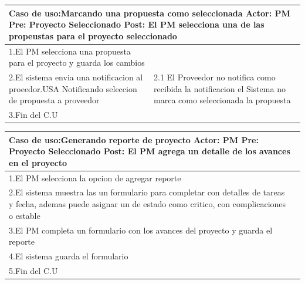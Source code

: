 \begin{longtable}{|p{}|p{}|}
    \hline
    \multicolumn{2}{|p{16cm}|}{
        \textbf{Caso de uso:}Marcando una propuesta como seleccionada\newline
        \textbf{Actor:} PM\newline
        \textbf{Pre: }Proyecto Seleccionado\newline
        \textbf{Post:} El PM selecciona una de las propeustas para el proyecto seleccionado
    }\\
    \hline
    1.El PM selecciona una propuesta para el proyecto y guarda los cambios&\\
    \hline
    2.El sistema envia una notificacion al proeedor.USA Notificando seleccion de propuesta a proveedor& 2.1 El Proveedor no notifica como recibida la notificacion \newline 2.2 el Sistema no marca como seleccionada la propuesta\\
    \hline
    3.Fin del C.U&\\
    \hline
\end{longtable}

\begin{longtable}{|p{}|p{}|}
    \hline
    \multicolumn{2}{|p{16cm}|}{
        \textbf{Caso de uso:}Generando reporte de proyecto\newline
        \textbf{Actor:} PM\newline
        \textbf{Pre: }Proyecto Seleccionado\newline
        \textbf{Post:} El PM agrega un detalle de los avances en el proyecto
    }\\
    \hline
    1.El PM selecciona la opcion de agregar reporte &\\
    \hline
    2.El sistema muestra las un formulario para completar con detalles de tareas y fecha, ademas puede asignar un de estado como critico, con complicaciones o estable& \\
    \hline
    3.El PM completa un formulario con los avances del proyecto y guarda el reporte&\\
    \hline
    4.El sistema guarda el formulario&\\
    \hline
    5.Fin del C.U&\\
    \hline
\end{longtable}


